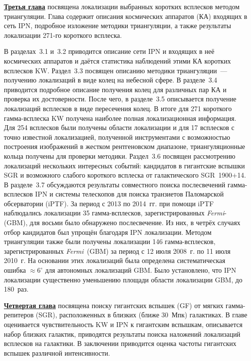 \underline{\textbf{Третья глава}} посвящена локализации выбранных коротких всплесков 
методом триангуляции. Глава содержит описания космических аппаратов (КА) входящих в сеть IPN, 
подробное изложение методики триангуляции, а также результаты локализации 
271-го короткого всплеска.  

В разделах~3.1 и~3.2 приводится описание сети IPN и входящих в неё космических 
аппаратов и даётся статистика наблюдений этими КА коротких всплесков KW. 
Раздел~3.3 посвящен описанию методики триангуляции~--- получению локализаций в 
виде колец на небесной сфере. В разделе~3.4 приводится подробное описание получения
колец для различных пар КА и проверка их достоверности. После чего, в разделе~3.5 описывается
получение локализаций всплесков в виде пересечения колец. 
В итоге для 271 короткого гамма-всплеска KW получена наиболее полная локализационная информация. 
Для 254 всплесков были получены области локализации и для 17 всплесков с точно 
известной локализацией, полученной инструментами с возможностью построения 
изображений в жестком рентгеновском диапазоне, триангуляционные кольца получены 
для проверки методики.
Раздел~3.6 посвящен 
рассмотрению локализаций нескольких интересных событий: кандидатов в гигантские вспышки SGR 
и возможного слабого короткого всплеска от галактического SGR~1900$+$14.
В разделе~3.7 обсуждаются результаты совместного поиска послесвечений гамма-всплесков IPN 
и системы телескопов для поиска транзиетов Паломарской обсерватории
(iPTF). За период с 2013 по 2014~гг. при помощи iPTF наблюдались локализации 35 гамма-всплесков, 
зарегистрированных \textit{Fermi}-(GBM), для восьми было обнаружено послесвечение. 
Из них, в четрёх случаях отбор кандидатов был упрощён благодаря IPN локализации. 
Методом триангуляции также были получены локализации 146 гамма-всплесков,
зарегистрированных \textit{Fermi}~(GBM) за период с 12 июля 2008~г. по 11 июля 2010~г.
На основании этих локализаций была определена систематическая ошибка $\approx 6^\circ$
для автономных локализаций GBM. Было установлено, что IPN локализации 
существенно уменьшению площади области локализации GBM, до 180~раз.  

\underline{\textbf{Четвертая глава}} посвящена поиску гигантских вспышек (GF) от мягких
гамма-репитеров (SGR), расположенных в близких (ближе 30~Мпк) галактиках.
В главе оценивается чувствительность KW и IPN к гигантским вспышкам, 
описывается набор близких галактик, приводятся результаты поиска наложений локализаций
всплесков на галактики. В заключении приводится оценка частоты гигантских вспышек различной 
интенсивности.

